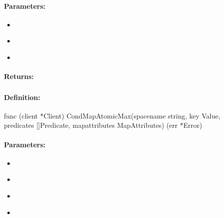 \paragraph{Parameters:}
\begin{itemize}[noitemsep]
\item {}\\

\item {}\\

\item {}\\

\end{itemize}

\paragraph{Returns:}


\pagebreak
\subsubsection{}
\label{api:Go:CondMapAtomicMax}


\paragraph{Definition:}
\begin{gocode}
func (client *Client) CondMapAtomicMax(spacename string, key Value, predicates []Predicate, mapattributes MapAttributes) (err *Error)
\end{gocode}

\paragraph{Parameters:}
\begin{itemize}[noitemsep]
\item {}\\

\item {}\\

\item {}\\

\item {}\\

\end{itemize}


